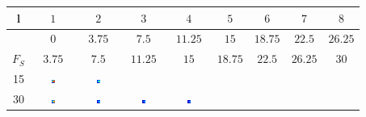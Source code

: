 \documentclass[12pt]{article}
\begin{document}
\begin{tabular}{||c | c c c c c c c c||} 
 \hline
 l      & $1$    &  $2$   & $3$     & $4$     & $5$     & $6$     & $7$     & $8$ \\ [0.5ex] 
\hline\hline
 ~      & $0$    &  $3.75$& $7.5$   & $11.25$ & $15$    & $18.75$ & $22.5$  & $26.25$ \\ [0.5ex] 
 $F_S$  & $3.75$ &  $7.5$ & $11.25$ & $15$    & $18.75$ & $22.5$  & $26.25$ & $30$ \\ [0.5ex] 
 \hline
        15 &
        \includegraphics[width=0.085\textwidth]{15STD_BAND-0-3.75.eps} &
        \includegraphics[width=0.085\textwidth]{15STD_BAND-3.75-7.5.eps} &
        ~ &
        ~ &
        ~ &
        ~ &
        ~ &
        ~ \\

        30 &
        \includegraphics[width=0.085\textwidth]{30STD_BAND-0-3.75.eps} &
        \includegraphics[width=0.085\textwidth]{30STD_BAND-3.75-7.5.eps} &
        \includegraphics[width=0.085\textwidth]{30STD_BAND-7.5-11.25.eps} &
        \includegraphics[width=0.085\textwidth]{30STD_BAND-11.25-15.eps} &
        ~ &
        ~ &
        ~ &
        ~ \\


\end{tabular}
\end{document}

